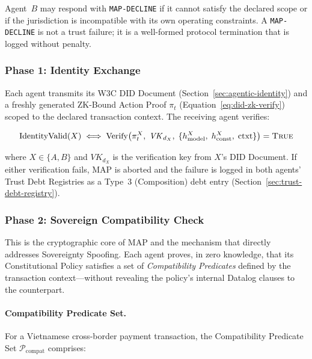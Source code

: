 Agent~$B$ may respond with \texttt{MAP-DECLINE} if it cannot satisfy the
declared scope or if the jurisdiction is incompatible with its own
operating constraints.  A \texttt{MAP-DECLINE} is not a trust failure; it
is a well-formed protocol termination that is logged without penalty.

\subsubsection*{Phase 1: Identity Exchange}

Each agent transmits its W3C DID Document
(Section~\ref{sec:agentic-identity}) and a freshly generated ZK-Bound
Action Proof $\pi_t$ (Equation~\ref{eq:did-zk-verify}) scoped to the
declared transaction context.  The receiving agent verifies:

\begin{equation}
\label{eq:map-identity-verify}
\text{IdentityValid}(X) \;\Longleftrightarrow\;
\text{Verify}\!\left(\pi^X_t,\; \mathit{VK}_{d_X},\;
\{h^X_{\text{model}},\; h^X_{\text{const}},\; \text{ctxt}\}\right)
= \textsc{True}
\end{equation}

where $X \in \{A, B\}$ and $\mathit{VK}_{d_X}$ is the verification key
from $X$'s DID Document.  If either verification fails, MAP is aborted and
the failure is logged in both agents' Trust Debt Registries as a Type~3
(Composition) debt entry (Section~\ref{sec:trust-debt-registry}).

\subsubsection*{Phase 2: Sovereign Compatibility Check}
\label{sec:map-sovereign-binding}

This is the cryptographic core of MAP and the mechanism that directly
addresses Sovereignty Spoofing.  Each agent proves, in zero knowledge,
that its Constitutional Policy satisfies a set of \emph{Compatibility
Predicates} defined by the transaction context---without revealing the
policy's internal Datalog clauses to the counterpart.

\paragraph{Compatibility Predicate Set.}

For a Vietnamese cross-border payment transaction, the Compatibility
Predicate Set $\mathcal{P}_{\text{compat}}$ comprises:

